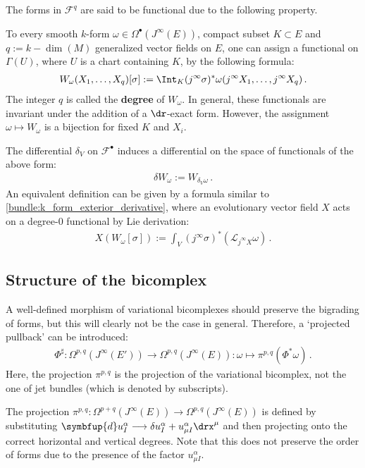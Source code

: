     The forms in $\mathcal{F}^q$ are said to be functional due to the following property.
    \begin{property}[Functionals]\label{var:functionals}
        To every smooth $k$-form $\omega\in\Omega^\bullet(J^\infty(E))$, compact subset $K\subset E$ and $q:=k-\dim(M)$ generalized vector fields on $E$, one can assign a functional on $\Gamma(U)$, where $U$ is a chart containing $K$, by the following formula:
        \begin{gather}
            W_\omega(X_1,\ldots,X_q)[\sigma] := \Int_K(j^\infty\sigma)^*\omega(j^\infty X_1,\ldots,j^\infty X_q)\,.
        \end{gather}
        The integer $q$ is called the \textbf{degree} of $W_\omega$. In general, these functionals are invariant under the addition of a $\dr$-exact form. However, the assignment $\omega\mapsto W_\omega$ is a bijection for fixed $K$ and $X_i$.
    \end{property}
    \begin{construct}
        The differential $\delta_V$ on $\mathcal{F}^\bullet$ induces a differential on the space of functionals of the above form:
        \begin{gather}
            \delta W_\omega := W_{\delta_V\omega}\,.
        \end{gather}
        An equivalent definition can be given by a formula similar to \cref{bundle:k_form_exterior_derivative}, where an evolutionary vector field $X$ acts on a degree-$0$ functional by Lie derivation:
        \begin{gather}
            X(W_\omega[\sigma]) := \int_V(j^\infty\sigma)^*(\mathcal{L}_{j^\infty X}\omega)\,.
        \end{gather}
    \end{construct}

\subsection{Structure of the bicomplex}

    A well-defined morphism of variational bicomplexes should preserve the bigrading of forms, but this will clearly not be the case in general. Therefore, a `projected pullback' can be introduced:
    \begin{gather}
        \Phi^\sharp:\Omega^{p,q}(J^\infty(E'))\rightarrow\Omega^{p,q}(J^\infty(E)):\omega\mapsto\pi^{p,q}(\Phi^*\omega)\,.
    \end{gather}
    Here, the projection $\pi^{p,q}$ is the projection of the variational bicomplex, not the one of jet bundles (which is denoted by subscripts).
    \begin{remark}\label{var:degree_raise_remark}
        The projection $\pi^{p,q}:\Omega^{p+q}(J^\infty(E))\rightarrow\Omega^{p,q}(J^\infty(E))$ is defined by substituting $\symbfup{d}u^\alpha_I\longrightarrow\delta u^\alpha_I + u^\alpha_{\mu I}\drx^\mu$ and then projecting onto the correct horizontal and vertical degrees. Note that this does not preserve the order of forms due to the presence of the factor $u^\alpha_{\mu I}$.
    \end{remark}

